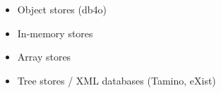 \begin{breakbox}
\begin{itemize}
	\item Object stores (db4o)
	\item In-memory stores
	\item Array stores
	\item Tree stores / XML databases (Tamino, eXist)
\end{itemize}
\end{breakbox}























